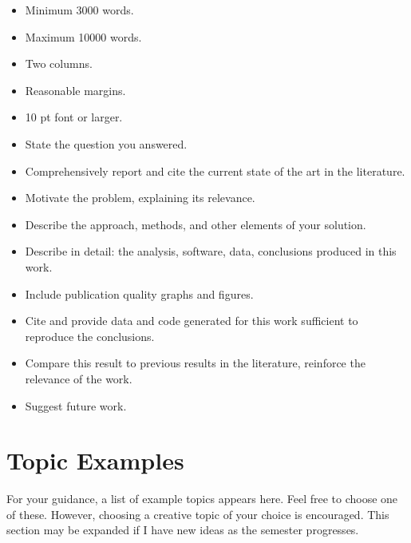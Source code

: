 \documentclass[12pts, answers]{exam}
\begin{document}
\begin{questions}
\begin{itemize}
\item Minimum 3000 words.
\item Maximum 10000 words.
\item Two columns.
\item Reasonable margins.
\item 10 pt font or larger.
\item State the question you answered.
\item Comprehensively report and cite the current state of the art in the literature.
\item Motivate the problem, explaining its relevance.
\item Describe the approach, methods, and other elements of your solution.
\item Describe in detail: the analysis, software, data, conclusions produced in this work.
\item Include publication quality graphs and figures.
\item Cite and provide data and code generated for this work sufficient to reproduce the conclusions.
\item Compare this result to previous results in the literature, reinforce the relevance of the work.
\item Suggest future work.
\end{itemize}

\end{questions}


\section*{Topic Examples}
For your guidance, a list of example topics appears here.
Feel free to choose one of these.  However, choosing a creative topic
of your choice is encouraged. This section may be expanded if I have new ideas
as the semester progresses.
\end{document}
